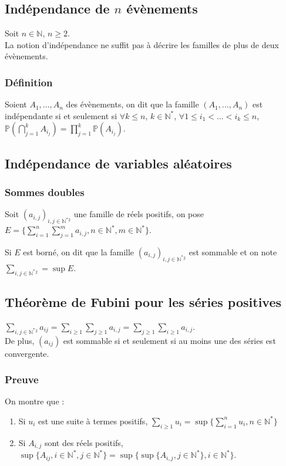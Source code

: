 \documentclass[a4paper,10pt]{book} %
\newcommand{\N}{\mathbb{N}}
\renewcommand{\P}{\mathbb{P}} %
\begin{document}
\subsection{Indépendance de $n$ évènements}
Soit $n\in \N$, $n\geq 2$.\\

La notion d'indépendance ne suffit pas à décrire les familles de plus de deux évènements.

\subsubsection{Définition}
Soient $A_1,...,A_n$ des évènements, on dit que la famille $(A_1,...,A_n)$ est indépendante si et seulement si $\forall k\leq n$, $k\in\N^*$, $\forall 1\leq i_1<...<i_k\leq n$, $\displaystyle \P(\bigcap_{j=1}^kA_{i_j})=\prod_{j=1}^{k}\P(A_{i_j})$.

\subsection{Indépendance de variables aléatoires}
\subsubsection{Sommes doubles}
Soit $(a_{i,j})_{i,j\in \N^*{}^2}$ une famille de réels positifs, on pose $\displaystyle E=\{ \sum_{i=1}^n \sum_{j=1}^m a_{i,j}, n\in \N^*, m\in \N^* \}$.

Si $E$ est borné, on dit que la famille $(a_{i,j})_{i,j\in\N^*{}^2}$ est sommable et on note $\sum_{i,j\in \N^*{}^2}=\sup E$.

\subsection{Théorème de Fubini pour les séries positives}
$\displaystyle \sum_{i,j\in \N^*{}^2}a_{ij}=\sum_{i\geq 1}\sum_{j\geq 1}a_{i,j}=\sum_{j\geq 1}\sum_{i\geq 1}a_{i,j}$.\\

De plus, $(a_{ij})$ est sommable si et seulement si au moins une des séries est convergente.

\subsubsection{Preuve}
On montre que :
\begin{enumerate}
\item Si $u_i$ est une suite à termes positifs, $\displaystyle \sum_{i\geq 1}u_i=\sup\{\sum_{i=1}^nu_i, n\in \N^*\}$
\item Si $A_{i,j}$ sont des réels positifs, $\displaystyle \sup\{A_{ij}, i\in\N^*, j\in \N^* \}=\sup\{\sup\{ A_{i,j},j\in\N^* \}, i\in\N^* \}$.
\end{enumerate}
\bigskip
\end{document}
